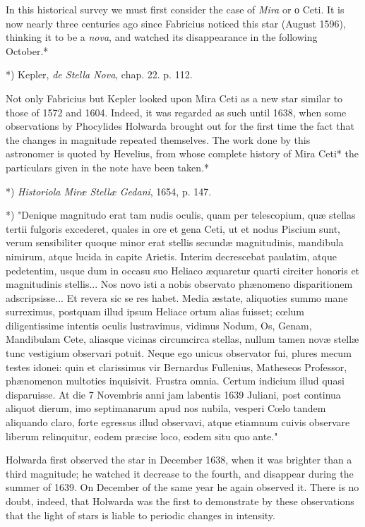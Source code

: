 \documentclass[a4paper, 12pt, oneside, polutonikogreek, english]{article}
\begin{document}
In this historical survey we must first consider the case of \emph{Mira} or ο Ceti. It is now nearly three centuries ago since Fabricius noticed this star (August 1596), thinking it to be a \emph{nova}, and watched its disappearance in the following October.*

*) Kepler, \emph{de Stella Nova}, chap. 22. p. 112.

Not only Fabricius but Kepler looked upon Mira Ceti as a new star similar to those of 1572 and 1604. Indeed, it was regarded as such until 1638, when some observations by Phocylides Holwarda brought out for the first time the fact that the changes in magnitude repeated themselves. The work done by this astronomer is quoted by Hevelius, from whose complete history of Mira Ceti* the particulars given in the note have been taken.*

*) \emph{Historiola Miræ Stellæ Gedani}, 1654, p. 147.

*) "Denique magnitudo erat tam nudis oculis, quam per telescopium, quæ stellas tertii fulgoris excederet, quales in ore et gena Ceti, ut et nodus Piscium sunt, verum sensibiliter quoque minor erat stellis secundæ magnitudinis, mandibula nimirum, atque lucida in capite Arietis. Interim decrescebat paulatim, atque pedetentim, usque dum in occasu suo Heliaco æquaretur quarti circiter honoris et magnitudinis stellis... Nos novo isti a nobis observato phænomeno disparitionem adscripsisse... Et revera sic se res habet. Media æstate, aliquoties summo mane surreximus, postquam illud ipsum Heliace ortum alias fuisset; cœlum diligentissime intentis oculis lustravimus, vidimus Nodum, Os, Genam, Mandibulam Cete, aliasque vicinas circumcirca stellas, nullum tamen novæ stellæ tunc vestigium observari potuit. Neque ego unicus observator fui, plures mecum testes idonei: quin et clarissimus vir Bernardus Fullenius, Matheseos Professor, phænomenon multoties inquisivit. Frustra omnia. Certum indicium illud quasi disparuisse. At die 7 Novembris anni jam labentis 1639 Juliani, post continua aliquot dierum, imo septimanarum apud nos nubila, vesperi Cœlo tandem aliquando claro, forte egressus illud observavi, atque etiamnum cuivis observare liberum relinquitur, eodem præcise loco, eodem situ quo ante."

Holwarda first observed the star in December 1638, when it was brighter than a third magnitude; he watched it decrease to the fourth, and disappear during the summer of 1639. On December of the same year he again observed it. There is no doubt, indeed, that Holwarda was the first to demonstrate by these observations that the light of stars is liable to periodic changes in intensity.
\end{document}

